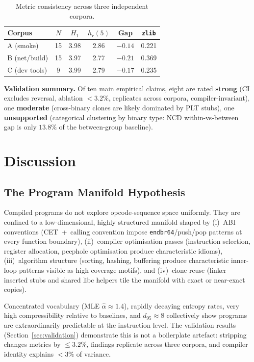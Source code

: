 \documentclass[conference]{IEEEtran}
\newcommand{\hr}[1]{h_r(#1)}
\newcommand{\zlib}{\texttt{zlib}}
\begin{document}
\begin{table}[t]
\centering
\caption{Metric consistency across three independent corpora.}
\label{tab:corpora}
\begin{tabular}{@{}lccccc@{}}
\toprule
\textbf{Corpus} & $N$ & $H_1$ & $\hr{5}$ & \textbf{Gap} & \zlib{} \\
\midrule
A (smoke)     & 15 & 3.98 & 2.86 & $-0.14$ & 0.221 \\
B (net/build) & 15 & 3.97 & 2.77 & $-0.21$ & 0.369 \\
C (dev tools) &  9 & 3.99 & 2.79 & $-0.17$ & 0.235 \\
\bottomrule
\end{tabular}
\end{table}

\textbf{Validation summary.}
Of ten main empirical claims, eight are rated \textbf{strong}
(CI excludes reversal, ablation $<3.2\%$, replicates across corpora,
compiler-invariant), one \textbf{moderate} (cross-binary clones are
likely dominated by PLT stubs), one \textbf{unsupported} (categorical
clustering by binary type: NCD within-vs-between gap is only $13.8\%$
of the between-group baseline).

\section{Discussion}
\label{sec:discussion}

\subsection{The Program Manifold Hypothesis}

Compiled programs do not explore opcode-sequence space uniformly.  They
are confined to a low-dimensional, highly structured manifold shaped by
(i)~ABI conventions (CET~+~calling convention impose
\texttt{endbr64}/push/pop patterns at every function boundary),
(ii)~compiler optimisation passes (instruction selection, register
allocation, peephole optimisation produce characteristic idioms),
(iii)~algorithm structure (sorting, hashing, buffering produce
characteristic inner-loop patterns visible as high-coverage motifs),
and (iv)~clone reuse (linker-inserted stubs and shared libc helpers tile
the manifold with exact or near-exact copies).

Concentrated vocabulary
(MLE $\hat{\alpha}{\approx}1.4$), rapidly decaying entropy rates, very
high compressibility relative to baselines, and $d_{95}{\approx}8$
collectively show programs are extraordinarily predictable at the
instruction level.  The validation results
(Section~\ref{sec:validation}) demonstrate this is not a boilerplate
artefact: stripping changes metrics by ${\leq}3.2\%$, findings replicate
across three corpora, and compiler identity explains ${<}3\%$ of variance.
\end{document}
